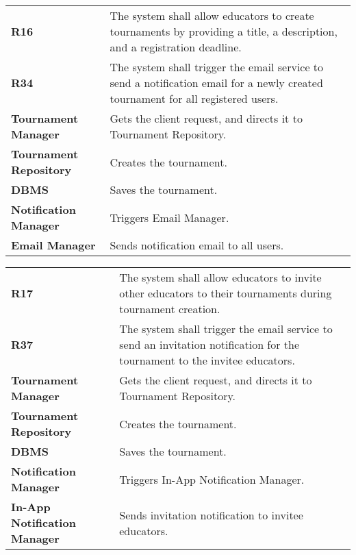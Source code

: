 \begin{table}[h!]
  \centering
  \begin{tabular}{lp{12cm}}
    \hline
    \textbf{R16} & The system shall allow educators to create tournaments by providing a title, a description, and a registration 
    deadline. \\
    \textbf{R34} & The system shall trigger the email service to send a notification email for a newly created tournament for all registered users.\\
    \hline
    \hline
    \textbf{Tournament Manager} & Gets the client request, and directs it to Tournament Repository. \\
    \textbf{Tournament Repository} & Creates the tournament.\\
    \textbf{DBMS} & Saves the tournament. \\
    \textbf{Notification Manager} &  Triggers Email Manager.\\
    \textbf{Email Manager} &  Sends notification email to all users.\\
    \hline
  \end{tabular}
\end{table}


\begin{table}[h!]
  \centering
  \begin{tabular}{lp{12cm}}
    \hline
    \textbf{R17} & The system shall allow educators to invite other educators to their tournaments during tournament creation. \\
    \textbf{R37} & The system shall trigger the email service to send an invitation notification for the tournament to the invitee educators.\\
    \hline
    \hline
    \textbf{Tournament Manager} & Gets the client request, and directs it to Tournament Repository. \\
    \textbf{Tournament Repository} & Creates the tournament.\\
    \textbf{DBMS} & Saves the tournament. \\
    \textbf{Notification Manager} &  Triggers In-App Notification Manager.\\
    \textbf{In-App Notification Manager} &  Sends invitation notification to invitee educators.\\
    \hline
  \end{tabular}
\end{table}

